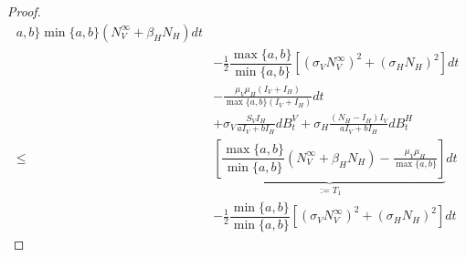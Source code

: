 \begin{proof}
\begin{equation}
\begin{aligned}
{                    a, b
                \}
            }{
                \min\{
                    a, b
                \}
            }
            \left (
                 N_V ^ \infty
                +
                \beta_H N_H
            \right ) dt
            \\
            & 
            -
            \frac{1}{2}
            \dfrac{
                \max\{
                    a, b
                \}
            }{
                \min\{
                    a, b
                \}
            }
            \left[
                \left(
                    \sigma_V N_V ^ \infty
                \right) ^ 2
                +
                \left(
                    \sigma_H N_H
                \right) ^2
            \right] dt
            \\
            &
            -
            \frac{
                \mu_V \mu_H (I_V + I_H)
            }{\max \{a, b\} (I_V + I_H)}
            dt
            \\
            & +
            \sigma_V 
            \frac{S_V I_H}{a I_V + b I_H}
            d B_t ^ V
            +
            \sigma_H
            \frac{(N_H - I_H) I_V}{a I_V + b I_H}
            d B_t ^ H
            \\
            \leq &
                \underbrace{
                    \left[
                        \dfrac{
                            \max\{a, b\}
                        }{
                            \min\{a, b\}
                        }
                        \left (
                             N_V ^ \infty
                            +
                            \beta_H N_H
                        \right )
                        -
                        \frac{
                            \mu_V \mu_H 
                        }{
                            \max \{a, b\} 
                        }
                     \right]
                }_{:= T_1}
                 dt
            \\
            &
            -
            \frac{1}{2}
                \dfrac{
                    \min\{
                        a, b
                    \}
                }{
                    \min\{
                        a, b
                    \}
                }
            \left [
                \left(
                    \sigma_V N_V ^ \infty
                \right) ^ 2
                +
                \left(
                    \sigma_H N_H
                \right) ^2
            \right ] dt

\end{aligned}
\end{equation}
\end{proof}
